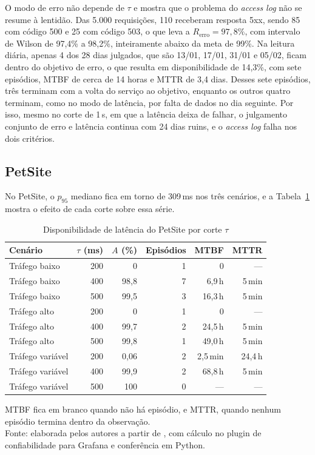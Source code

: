 \documentclass[12pt, a4paper, oneside]{article}
\begin{document}
O modo de erro não depende de $\tau$ e mostra que o problema do \textit{access log} não se resume à lentidão. Das 5.000 requisições, 110 receberam resposta 5xx, sendo 85 com código 500 e 25 com código 503, o que leva a $R_{\mathrm{erro}} = 97{,}8\%$, com intervalo de Wilson de 97,4\% a 98,2\%, inteiramente abaixo da meta de 99\%. Na leitura diária, apenas 4 dos 28 dias julgados, que são 13/01, 17/01, 31/01 e 05/02, ficam dentro do objetivo de erro, o que resulta em disponibilidade de 14,3\%, com sete episódios, MTBF de cerca de 14 horas e MTTR de 3,4 dias. Desses sete episódios, três terminam com a volta do serviço ao objetivo, enquanto os outros quatro terminam, como no modo de latência, por falta de dados no dia seguinte. Por isso, mesmo no corte de 1\,s, em que a latência deixa de falhar, o julgamento conjunto de erro e latência continua com 24 dias ruins, e o \textit{access log} falha nos dois critérios.

\subsection{PetSite}

No PetSite, o $p_{95}$ mediano fica em torno de 309\,ms nos três cenários, e a Tabela~\ref{tab:pet} mostra o efeito de cada corte sobre essa série.

\begin{table}[htbp]
\centering
\caption{Disponibilidade de latência do PetSite por corte $\tau$}
\label{tab:pet}
\small
\setlength{\tabcolsep}{5pt}
\begin{tabular}{lrrrrr}
\toprule
Cenário & $\tau$ (ms) & $A$ (\%) & Episódios & MTBF & MTTR \\
\midrule
Tráfego baixo & 200 & 0 & 1 & 0 & --- \\
Tráfego baixo & 400 & 98,8 & 7 & 6,9\,h & 5\,min \\
Tráfego baixo & 500 & 99,5 & 3 & 16,3\,h & 5\,min \\
Tráfego alto & 200 & 0 & 1 & 0 & --- \\
Tráfego alto & 400 & 99,7 & 2 & 24,5\,h & 5\,min \\
Tráfego alto & 500 & 99,8 & 1 & 49,0\,h & 5\,min \\
Tráfego variável & 200 & 0,06 & 2 & 2,5\,min & 24,4\,h \\
Tráfego variável & 400 & 99,9 & 2 & 68,8\,h & 5\,min \\
Tráfego variável & 500 & 100 & 0 & --- & --- \\
\bottomrule
\end{tabular}

\vspace{0.4em}

{\footnotesize MTBF fica em branco quando não há episódio, e MTTR, quando nenhum episódio termina dentro da observação.\\
Fonte: elaborada pelos autores a partir de , com cálculo no plugin de confiabilidade para Grafana e conferência em Python.}
\end{table}
\end{document}
